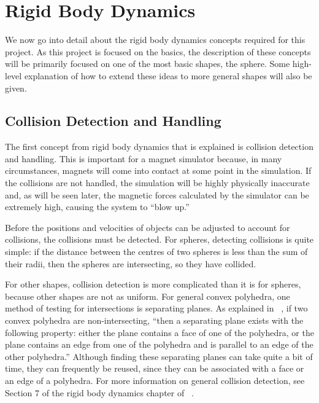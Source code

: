 \documentclass[tog]{acmsiggraph}
\begin{document}
\section{Rigid Body Dynamics}

We now go into detail about the rigid body dynamics concepts required for this project. As this project is focused on the basics, the description of these concepts will be primarily focused on one of the most basic shapes, the sphere. Some high-level explanation of how to extend these ideas to more general shapes will also be given.

\subsection{Collision Detection and Handling}

The first concept from rigid body dynamics that is explained is collision detection and handling. This is important for a magnet simulator because, in many circumstances, magnets will come into contact at some point in the simulation. If the collisions are not handled, the simulation will be highly physically inaccurate and, as will be seen later, the magnetic forces calculated by the simulator can be extremely high, causing the system to ``blow up.''

Before the positions and velocities of objects can be adjusted to account for collisions, the collisions must be detected. For spheres, detecting collisions is quite simple: if the distance between the centres of two spheres is less than the sum of their radii, then the spheres are intersecting, so they have collided.

For other shapes, collision detection is more complicated than it is for spheres, because other shapes are not as uniform. For general convex polyhedra, one method of testing for intersections is separating planes. As explained in ~\cite{pixarnotes}, if two convex polyhedra are non-intersecting, ``then a separating plane exists with the following property: either the plane contains a face of one of the polyhedra, or the plane contains an edge from one of the polyhedra and is parallel to an edge of the other polyhedra.'' Although finding these separating planes can take quite a bit of time, they can frequently be reused, since they can be associated with a face or an edge of a polyhedra. For more information on general collision detection, see Section 7 of the rigid body dynamics chapter of ~.
\end{document}
